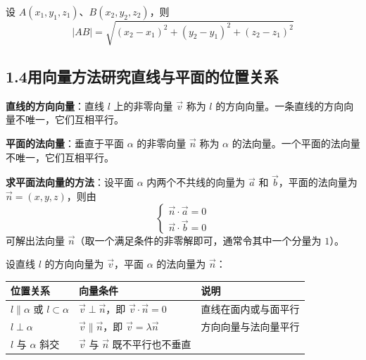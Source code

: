 \documentclass[12pt, a4paper]{ctexart}
\begin{document}
\begin{knowledgebox}[空间两点间距离公式]
设 $A(x_1,y_1,z_1)$、$B(x_2,y_2,z_2)$，则
\[
|AB|=\sqrt{(x_2-x_1)^2+(y_2-y_1)^2+(z_2-z_1)^2}
\]
\end{knowledgebox}

\subsection*{1.4\quad 用向量方法研究直线与平面的位置关系}

\begin{knowledgebox}[直线的方向向量与平面的法向量]
\textbf{直线的方向向量}：直线 $l$ 上的非零向量 $\vec{v}$ 称为 $l$ 的方向向量。一条直线的方向向量不唯一，它们互相平行。

\textbf{平面的法向量}：垂直于平面 $\alpha$ 的非零向量 $\vec{n}$ 称为 $\alpha$ 的法向量。一个平面的法向量不唯一，它们互相平行。

\medskip
\textbf{求平面法向量的方法}：设平面 $\alpha$ 内两个不共线的向量为 $\vec{a}$ 和 $\vec{b}$，平面的法向量为 $\vec{n}=(x,y,z)$，则由
\[
\begin{cases}\vec{n}\cdot\vec{a}=0\\\vec{n}\cdot\vec{b}=0\end{cases}
\]
可解出法向量 $\vec{n}$（取一个满足条件的非零解即可，通常令其中一个分量为 $1$）。
\end{knowledgebox}

\begin{knowledgebox}[用向量判定线面关系]
设直线 $l$ 的方向向量为 $\vec{v}$，平面 $\alpha$ 的法向量为 $\vec{n}$：

\begin{center}
\renewcommand{\arraystretch}{1.5}
\begin{tabular}{lll}
\toprule
位置关系 & 向量条件 & 说明 \\
\midrule
$l\parallel\alpha$ 或 $l\subset\alpha$ & $\vec{v}\perp\vec{n}$，即 $\vec{v}\cdot\vec{n}=0$ & 直线在面内或与面平行 \\
$l\perp\alpha$ & $\vec{v}\parallel\vec{n}$，即 $\vec{v}=\lambda\vec{n}$ & 方向向量与法向量平行 \\
$l$ 与 $\alpha$ 斜交 & $\vec{v}$ 与 $\vec{n}$ 既不平行也不垂直 & \\
\bottomrule
\end{tabular}
\end{center}
\end{knowledgebox}
\end{document}
